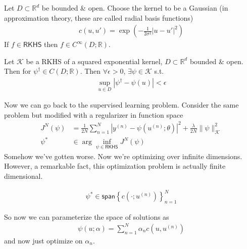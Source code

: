 \documentclass[11pt,fleqn]{article}
\numberwithin{equation}{section}
\theoremstyle{definition}
\theoremstyle{definition}
\begin{document}
\begin{eg}
	 Let $D \subset \mathbb R^d$ be bounded \& open. Choose the kernel to be a Gaussian (in approximation theory, these are called radial basis functions)
	\begin{align}
		c(u, u') = \exp \left( - \frac{1}{2\sigma^2} |u - u'|^2 \right)
	\end{align}
	If $f \in \textsf{RKHS}$ then $f \in C^\infty(D; \mathbb R)$.
\end{eg}
\begin{theorem}
	Let $\mathcal K$ be a RKHS of a squared exponential kernel, $D \subset \mathbb R^d$ bounded \& open. Then for $\psi^\dagger \in C(D; \mathbb R)$. Then $\forall \epsilon > 0$, $\exists \psi \in \mathcal K$ s.t.
	\begin{align}
		\sup_{u \in D} |\psi^\dagger - \psi(u)| < \epsilon
	\end{align}
\end{theorem}

Now we can go back to the supervised learning problem. Consider the same problem but modified with a regularizer in function space
\begin{align}
	J^N(\psi) & = \frac{1}{2N} \sum_{n=1}^N |y^{(n)} - \psi(u^{(n)} ; \theta)|^2 + \frac{\lambda}{2N} \| \psi\|_{\mathcal K}^2\\
	\psi^* & \in \arg \inf_{\psi \in \textsf{RKHS}} J^N(\psi)
\end{align}
Somehow we've gotten worse. Now we're optimizing over infinite dimensions. However, a remarkable fact, this optimization problem is actually finite dimensional.
\begin{theorem}
	\begin{align}
		\psi^* \in \textsf{span} \left\{ c(\cdot; u^{(n)})  \right\}_{n=1}^N
	\end{align}
\end{theorem}
So now we can parameterize the space of solutions as
\begin{align}
	\psi(u; \alpha) = \sum_{n=1}^N \alpha_n c(u, u^{(n)})
\end{align}
and now just optimize on $\alpha_n$.
\end{document}
